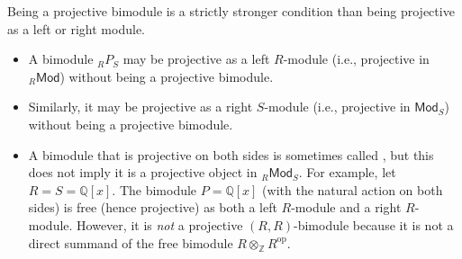 \begin{definition}
    Being a projective bimodule is a strictly stronger condition than being projective as a left or right module. 
    \begin{itemize}
        \item A bimodule ${}_R P_S$ may be projective as a left $R$-module (i.e., projective in ${}_R\mathsf{Mod}$) without being a projective bimodule.

        \item Similarly, it may be projective as a right $S$-module (i.e., projective in $\mathsf{Mod}_S$) without being a projective bimodule.

        \item A bimodule that is projective on both sides is sometimes called , but this does not imply it is a projective object in ${}_R\mathsf{Mod}_S$. For example, let $R = S = \mathbb{Q}[x]$. The bimodule $P = \mathbb{Q}[x]$ (with the natural action on both sides) is free (hence projective) as both a left $R$-module and a right $R$-module. However, it is \textit{not} a projective $(R,R)$-bimodule because it is not a direct summand of the free bimodule $R \otimes_{\mathbb{Z}} R^{\operatorname{op}}$.


    \end{itemize}
\end{definition}